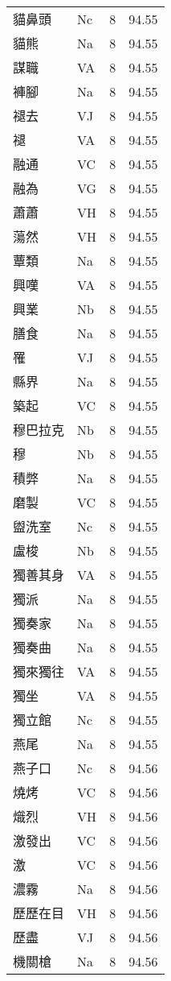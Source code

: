 \documentclass[twocolumn]{book}
\begin{document}
\begin{supertabular}{llrr}
貓鼻頭 & Nc & 8 &  94.55\\
貓熊 & Na & 8 &  94.55\\
謀職 & VA & 8 &  94.55\\
褲腳 & Na & 8 &  94.55\\
褪去 & VJ & 8 &  94.55\\
褪 & VA & 8 &  94.55\\
融通 & VC & 8 &  94.55\\
融為 & VG & 8 &  94.55\\
蕭蕭 & VH & 8 &  94.55\\
蕩然 & VH & 8 &  94.55\\
蕈類 & Na & 8 &  94.55\\
興嘆 & VA & 8 &  94.55\\
興業 & Nb & 8 &  94.55\\
膳食 & Na & 8 &  94.55\\
罹 & VJ & 8 &  94.55\\
縣界 & Na & 8 &  94.55\\
築起 & VC & 8 &  94.55\\
穆巴拉克 & Nb & 8 &  94.55\\
穆 & Nb & 8 &  94.55\\
積弊 & Na & 8 &  94.55\\
磨製 & VC & 8 &  94.55\\
盥洗室 & Nc & 8 &  94.55\\
盧梭 & Nb & 8 &  94.55\\
獨善其身 & VA & 8 &  94.55\\
獨派 & Na & 8 &  94.55\\
獨奏家 & Na & 8 &  94.55\\
獨奏曲 & Na & 8 &  94.55\\
獨來獨往 & VA & 8 &  94.55\\
獨坐 & VA & 8 &  94.55\\
獨立館 & Nc & 8 &  94.55\\
燕尾 & Na & 8 &  94.55\\
燕子口 & Nc & 8 &  94.56\\
燒烤 & VC & 8 &  94.56\\
熾烈 & VH & 8 &  94.56\\
激發出 & VC & 8 &  94.56\\
激 & VC & 8 &  94.56\\
濃霧 & Na & 8 &  94.56\\
歷歷在目 & VH & 8 &  94.56\\
歷盡 & VJ & 8 &  94.56\\
機關槍 & Na & 8 &  94.56\\

\end{supertabular}
\end{document}
